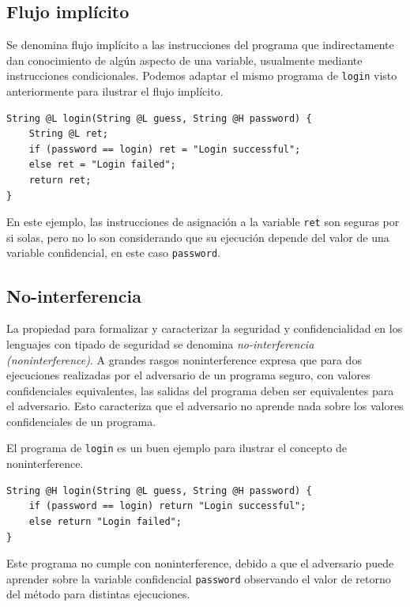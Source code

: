 	\subsection{Flujo implícito}

	Se denomina flujo implícito a las instrucciones del programa que indirectamente dan conocimiento de algún aspecto de una variable, usualmente mediante instrucciones condicionales. Podemos adaptar el mismo programa de \texttt{login} visto anteriormente para ilustrar el flujo implícito.

	\begin{lstlisting}
String @L login(String @L guess, String @H password) {
	String @L ret;
	if (password == login) ret = "Login successful";
	else ret = "Login failed";
	return ret;
}
	\end{lstlisting}

	En este ejemplo, las instrucciones de asignación a la variable \texttt{ret} son seguras por si solas, pero no lo son considerando que su ejecución depende del valor de una variable confidencial, en este caso \texttt{password}.

	\subsection{No-interferencia}
	La propiedad para formalizar y caracterizar la seguridad y confidencialidad en los lenguajes con tipado de seguridad se denomina \textit{no-interferencia (noninterference)}. A grandes rasgos noninterference expresa que para dos ejecuciones realizadas por el adversario de un programa seguro, con valores confidenciales equivalentes, las salidas del programa deben ser equivalentes para el adversario. Esto caracteriza que el adversario no aprende nada sobre los valores confidenciales de un programa.

	El programa de \texttt{login} es un buen ejemplo para ilustrar el concepto de noninterference.

	\begin{lstlisting}
String @H login(String @L guess, String @H password) {
	if (password == login) return "Login successful";
	else return "Login failed";
}
	\end{lstlisting}

	Este programa no cumple con noninterference, debido a que el adversario puede aprender sobre la variable confidencial \texttt{password} observando el valor de retorno del método para distintas ejecuciones.

